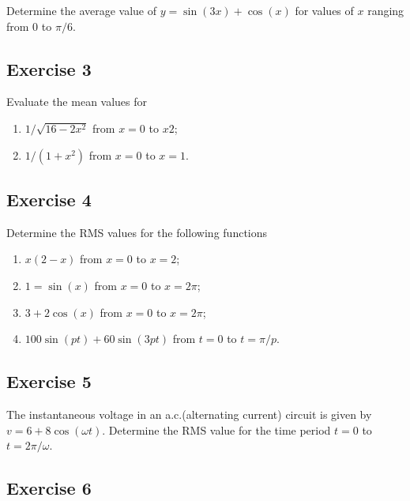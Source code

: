 \documentclass[
  11pt,
  oneside]{book}
\providecommand{\tightlist}{%
  \setlength{\itemsep}{0pt}\setlength{\parskip}{0pt}}
\newcommand{\slide}{}
\theoremstyle{definition}
\theoremstyle{definition}
\theoremstyle{definition}
\theoremstyle{definition}
\theoremstyle{remark}
\begin{document}
Determine the average value of \(y = \sin(3x) + \cos(x)\) for values of \(x\) ranging from \(0\) to \(\pi/6\).

\slide

\subsection*{Exercise 3}\label{exercise-3-7}

Evaluate the mean values for

\begin{enumerate}
\def\labelenumi{\arabic{enumi}.}
\tightlist
\item
  \(1/\sqrt{16-2x^2}\) from \(x=0\) to \(x2\);
\item
  \(1/(1+x^2)\) from \(x=0\) to \(x=1\).
\end{enumerate}

\slide

\subsection*{Exercise 4}\label{exercise-4-5}

Determine the RMS values for the following functions

\begin{enumerate}
\def\labelenumi{\arabic{enumi}.}
\tightlist
\item
  \(x(2-x)\) from \(x=0\) to \(x=2\);
\item
  \(1=\sin(x)\) from \(x=0\) to \(x=2\pi\);
\item
  \(3+2\cos(x)\) from \(x=0\) to \(x=2\pi\);
\item
  \(100\sin(pt)+60\sin(3pt)\) from \(t=0\) to \(t=\pi/p\).
\end{enumerate}

\slide

\subsection*{Exercise 5}\label{exercise-5-4}

The instantaneous voltage in an a.c.(alternating current) circuit is given by \(v = 6 + 8\cos(\omega t)\).
Determine the RMS value for the time period \(t = 0\) to \(t = 2\pi/\omega\).

\slide

\subsection*{Exercise 6}\label{exercise-6-4}
\end{document}
